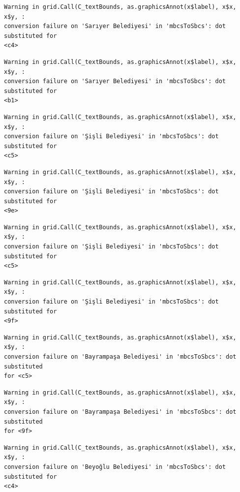 \documentclass[
  11pt,
  a4paper,
  DIV=11,
  numbers=noendperiod]{scrartcl}
\begin{document}
\begin{verbatim}
Warning in grid.Call(C_textBounds, as.graphicsAnnot(x$label), x$x, x$y, :
conversion failure on 'Sarıyer Belediyesi' in 'mbcsToSbcs': dot substituted for
<c4>
\end{verbatim}

\begin{verbatim}
Warning in grid.Call(C_textBounds, as.graphicsAnnot(x$label), x$x, x$y, :
conversion failure on 'Sarıyer Belediyesi' in 'mbcsToSbcs': dot substituted for
<b1>
\end{verbatim}

\begin{verbatim}
Warning in grid.Call(C_textBounds, as.graphicsAnnot(x$label), x$x, x$y, :
conversion failure on 'Şişli Belediyesi' in 'mbcsToSbcs': dot substituted for
<c5>
\end{verbatim}

\begin{verbatim}
Warning in grid.Call(C_textBounds, as.graphicsAnnot(x$label), x$x, x$y, :
conversion failure on 'Şişli Belediyesi' in 'mbcsToSbcs': dot substituted for
<9e>
\end{verbatim}

\begin{verbatim}
Warning in grid.Call(C_textBounds, as.graphicsAnnot(x$label), x$x, x$y, :
conversion failure on 'Şişli Belediyesi' in 'mbcsToSbcs': dot substituted for
<c5>
\end{verbatim}

\begin{verbatim}
Warning in grid.Call(C_textBounds, as.graphicsAnnot(x$label), x$x, x$y, :
conversion failure on 'Şişli Belediyesi' in 'mbcsToSbcs': dot substituted for
<9f>
\end{verbatim}

\begin{verbatim}
Warning in grid.Call(C_textBounds, as.graphicsAnnot(x$label), x$x, x$y, :
conversion failure on 'Bayrampaşa Belediyesi' in 'mbcsToSbcs': dot substituted
for <c5>
\end{verbatim}

\begin{verbatim}
Warning in grid.Call(C_textBounds, as.graphicsAnnot(x$label), x$x, x$y, :
conversion failure on 'Bayrampaşa Belediyesi' in 'mbcsToSbcs': dot substituted
for <9f>
\end{verbatim}

\begin{verbatim}
Warning in grid.Call(C_textBounds, as.graphicsAnnot(x$label), x$x, x$y, :
conversion failure on 'Beyoğlu Belediyesi' in 'mbcsToSbcs': dot substituted for
<c4>
\end{verbatim}
\end{document}

